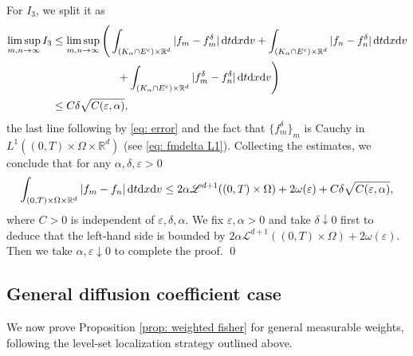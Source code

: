 \documentclass[10pt, reqno]{amsart}
\theoremstyle{plain}
\theoremstyle{definition}
\theoremstyle{remark}
\renewenvironment{proof}[1][\proofname]{\noindent{\scshape #1.\quad}}{\qed}
\numberwithin{equation}{section}
\newcommand{\R}{\mathbb{R}}
\newcommand{\ve}{\varepsilon}
\newcommand{\dx}{\textnormal{d}x}
\newcommand{\dv}{\textnormal{d}v}
\newcommand{\dt}{\textnormal{d}t}
\begin{document}
\begin{proof}[Proof of Lemma \ref{lem: key compactness}]
    For $I_3$, we split it as
    \begin{align*}
        \limsup_{m,n\to\infty} I_3 &\le \limsup_{m,n\to\infty}\Bigg( \int_{(K_\alpha \cap E^c)\times \R^d} |f_m - f_m^\delta| \,\dt\dx\dv + \int_{(K_\alpha \cap E^c)\times\R^d} |f_n - f_n^\delta| \,\dt\dx\dv \\
        &\qquad \qquad \qquad + \int_{(K_\alpha \cap E^c)\times\R^d} |f_m^\delta - f_n^\delta| \,\dt\dx\dv \Bigg)\\
        &\le C\delta \sqrt{C(\ve,\alpha)},
    \end{align*}
    the last line following by \eqref{eq: error} and the fact that $\{f_m^\delta\}_m$ is Cauchy in $L^1((0,T)\times\Omega\times\R^d)$ (see \eqref{eq: fmdelta L1}). Collecting the estimates, we conclude that for any $\alpha,\delta,\ve>0$
    \begin{align*}
        \int_{(0,T)\times\Omega\times\R^d} |f_m - f_n|\,\dt\dx\dv \le 2\alpha \mathscr{L}^{d+1}((0,T)\times\Omega) + 2\omega(\ve) + C\delta \sqrt{C(\ve,\alpha)},
    \end{align*}
    where $C>0$ is independent of $\ve,\delta,\alpha$. We fix $\ve,\alpha>0$ and take $\delta\downarrow 0$ first to deduce that the left-hand side is bounded by $2\alpha \mathscr{L}^{d+1}((0,T)\times\Omega) + 2\omega(\ve)$. Then we take $\alpha,\ve\downarrow 0$ to complete the proof.
\end{proof}
%
%
%
%
%
%
\subsection{General diffusion coefficient case} 
We now prove Proposition \ref{prop: weighted fisher} for general measurable weights,
following the level-set localization strategy outlined above.
 
\end{document}
